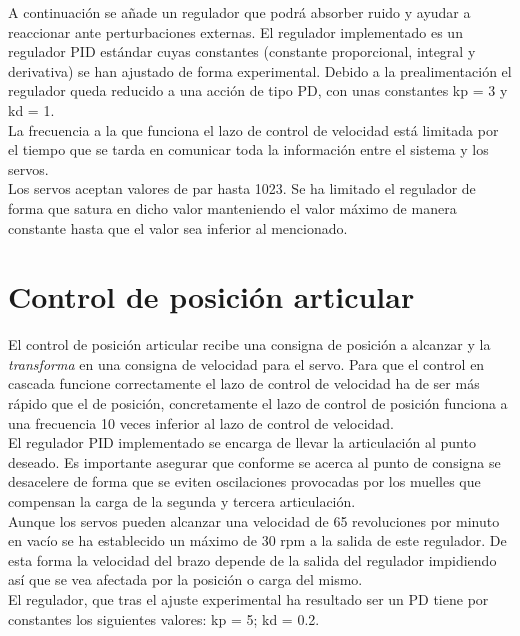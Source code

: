 A continuación se añade un regulador que podrá absorber ruido y ayudar a reaccionar ante perturbaciones externas. El regulador implementado es un regulador PID estándar cuyas constantes (constante proporcional, integral y derivativa) se han ajustado de forma experimental. Debido a la prealimentación el regulador queda reducido a una acción de tipo PD, con unas constantes kp = 3 y kd = 1.
\\

La frecuencia a la que funciona el lazo de control de velocidad está limitada por el tiempo que se tarda en comunicar toda la información entre el sistema y los servos.
\\

Los servos aceptan valores de par hasta 1023. Se ha limitado el regulador  de forma que satura en dicho valor manteniendo el valor máximo de manera constante hasta que el valor sea inferior al mencionado.

\section{Control de posición articular} \label{sec:Contorl:posicion_articular}

El control de posición articular recibe una consigna de posición a alcanzar y la \textit{transforma} en una consigna de velocidad para el servo. Para que el control en cascada funcione correctamente el lazo de control de velocidad ha de ser más rápido que el de posición, concretamente el lazo de control de posición funciona a una frecuencia 10 veces inferior al lazo de control de velocidad.
\\

El regulador PID implementado se encarga de llevar la articulación al punto deseado. Es importante asegurar que conforme se acerca al punto de consigna se desacelere de forma que se eviten oscilaciones provocadas por los muelles que compensan la carga de la segunda y tercera articulación.
\\

Aunque los servos pueden alcanzar una velocidad de 65 revoluciones por minuto en vacío se ha establecido un máximo de 30 rpm a la salida de este regulador. De esta forma la velocidad del brazo depende de la salida del regulador impidiendo así que se vea afectada por la posición o carga del mismo.
\\

El regulador, que tras el ajuste experimental ha resultado ser un PD tiene por constantes los siguientes valores: kp = 5; kd = 0.2.
